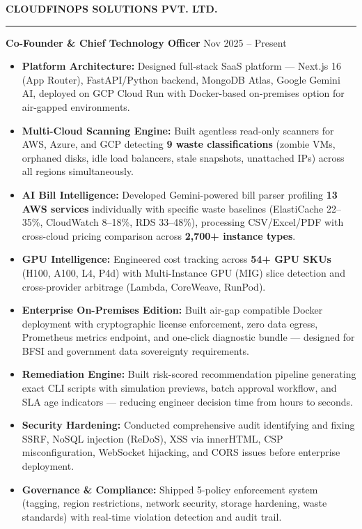 \documentclass[a4paper,10pt]{article}
\newcommand{\cvsection}[1]{%
  \vspace{2mm}
  \noindent\textbf{\large\MakeUppercase{#1}}
  \vspace{1mm}
  \hrule
  \vspace{1.5mm}
}
\begin{document}
\cvsection{CloudFinOps Solutions Pvt. Ltd.}
\textbf{Co-Founder \& Chief Technology Officer} \hfill Nov 2025 -- Present
\begin{itemize}
    \item \textbf{Platform Architecture:} Designed full-stack SaaS platform --- Next.js 16 (App Router), FastAPI/Python backend, MongoDB Atlas, Google Gemini AI, deployed on GCP Cloud Run with Docker-based on-premises option for air-gapped environments.

    \item \textbf{Multi-Cloud Scanning Engine:} Built agentless read-only scanners for AWS, Azure, and GCP detecting \textbf{9 waste classifications} (zombie VMs, orphaned disks, idle load balancers, stale snapshots, unattached IPs) across all regions simultaneously.

    \item \textbf{AI Bill Intelligence:} Developed Gemini-powered bill parser profiling \textbf{13 AWS services} individually with specific waste baselines (ElastiCache 22--35\%, CloudWatch 8--18\%, RDS 33--48\%), processing CSV/Excel/PDF with cross-cloud pricing comparison across \textbf{2,700+ instance types}.

    \item \textbf{GPU Intelligence:} Engineered cost tracking across \textbf{54+ GPU SKUs} (H100, A100, L4, P4d) with Multi-Instance GPU (MIG) slice detection and cross-provider arbitrage (Lambda, CoreWeave, RunPod).

    \item \textbf{Enterprise On-Premises Edition:} Built air-gap compatible Docker deployment with cryptographic license enforcement, zero data egress, Prometheus metrics endpoint, and one-click diagnostic bundle --- designed for BFSI and government data sovereignty requirements.

    \item \textbf{Remediation Engine:} Built risk-scored recommendation pipeline generating exact CLI scripts with simulation previews, batch approval workflow, and SLA age indicators --- reducing engineer decision time from hours to seconds.

    \item \textbf{Security Hardening:} Conducted comprehensive audit identifying and fixing SSRF, NoSQL injection (ReDoS), XSS via innerHTML, CSP misconfiguration, WebSocket hijacking, and CORS issues before enterprise deployment.

    \item \textbf{Governance \& Compliance:} Shipped 5-policy enforcement system (tagging, region restrictions, network security, storage hardening, waste standards) with real-time violation detection and audit trail.
\end{itemize}
\end{document}
